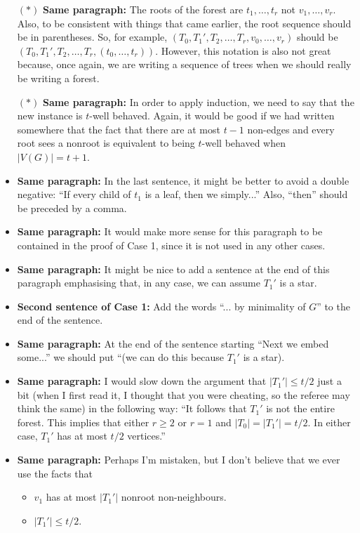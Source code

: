 \documentclass[11 pt]{article}
\theoremstyle{definition}
\theoremstyle{case}
\numberwithin{equation}{section}
\begin{document}
\begin{itemize}
\item[$\boldsymbol{(*)}$] \textbf{Same paragraph:} The roots of the forest are $t_1,\dots,t_r$ not $v_1,\dots,v_r$. Also, to be consistent with things that came earlier, the root sequence should be in parentheses. So, for example, $(T_0,T_1',T_2,\dots,T_r,v_0,\dots,v_r)$ should be $(T_0,T_1',T_2,\dots,T_r,(t_0,\dots,t_r))$. However, this notation is also not great because, once again, we are writing a sequence of trees when we should really be writing a forest. 
\item[$\boldsymbol{(*)}$] \textbf{Same paragraph:} In order to apply induction, we need to say that the new instance is $t$-well behaved. Again, it would be good if we had written somewhere that the fact that there are at most $t-1$ non-edges and every root sees a nonroot is equivalent to being $t$-well behaved when $|V(G)|=t+1$. 
\item \textbf{Same paragraph:} In the last sentence, it might be better to avoid a double negative: ``If every child of $t_1$ is a leaf, then we simply...'' Also, ``then'' should be preceded by a comma. 
\item \textbf{Same paragraph:} It would make more sense for this paragraph to be contained in the proof of Case 1, since it is not used in any other cases. 
\item \textbf{Same paragraph:} It might be nice to add a sentence at the end of this paragraph emphasising that, in any case, we can assume $T_1'$ is a star.
\item \textbf{Second sentence of Case 1:} Add the words ``... by minimality of $G$'' to the end of the sentence. 
\item \textbf{Same paragraph:} At the end of the sentence starting ``Next we embed some...'' we should put ``(we can do this because $T_1'$ is a star). 
\item \textbf{Same paragraph:} I would slow down the argument that $|T_1'|\leq t/2$ just a bit (when I first read it, I thought that you were cheating, so the referee may think the same) in the following way: ``It follows that $T_1'$ is not the entire forest. This implies that either $r\geq2$ or $r=1$ and $|T_0|=|T_1'|=t/2$. In either case, $T_1'$ has at most $t/2$ vertices.''
\item \textbf{Same paragraph:} Perhaps I'm mistaken, but I don't believe that we ever use the facts that
\begin{itemize}
\item $v_1$ has at most $|T_1'|$ nonroot non-neighbours.
\item $|T_1'|\leq t/2$. 

\end{itemize}
\end{itemize}
\end{document}
